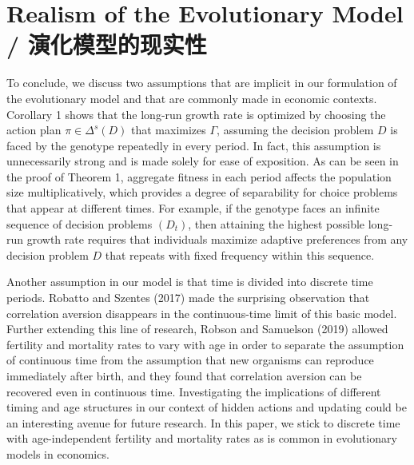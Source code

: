 \documentclass[12pt,a4paper]{article}
\newenvironment{original}
  {\par\noindent\color{black}\smallskip}
  {\par\smallskip}
\begin{document}
\newpage
\section{Realism of the Evolutionary Model / 演化模型的现实性}

\begin{original}
To conclude, we discuss two assumptions that are implicit in our formulation of the evolutionary model and that are commonly made in economic contexts. Corollary 1 shows that the long-run growth rate is optimized by choosing the action plan $\pi \in \Delta^s(D)$ that maximizes $\Gamma$, assuming the decision problem $D$ is faced by the genotype repeatedly in every period. In fact, this assumption is unnecessarily strong and is made solely for ease of exposition. As can be seen in the proof of Theorem 1, aggregate fitness in each period affects the population size multiplicatively, which provides a degree of separability for choice problems that appear at different times. For example, if the genotype faces an infinite sequence of decision problems $(D_t)$, then attaining the highest possible long-run growth rate requires that individuals maximize adaptive preferences from any decision problem $D$ that repeats with fixed frequency within this sequence.

Another assumption in our model is that time is divided into discrete time periods. Robatto and Szentes (2017) made the surprising observation that correlation aversion disappears in the continuous-time limit of this basic model. Further extending this line of research, Robson and Samuelson (2019) allowed fertility and mortality rates to vary with age in order to separate the assumption of continuous time from the assumption that new organisms can reproduce immediately after birth, and they found that correlation aversion can be recovered even in continuous time. Investigating the implications of different timing and age structures in our context of hidden actions and updating could be an interesting avenue for future research. In this paper, we stick to discrete time with age-independent fertility and mortality rates as is common in evolutionary models in economics.
\end{original}
\end{document}
